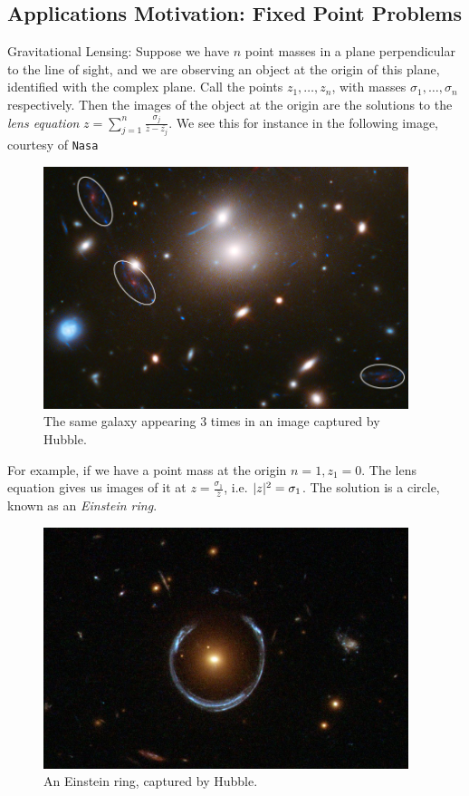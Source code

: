 \documentclass[10pt,a4paper]{article}
\begin{document}
\subsection{Applications Motivation: Fixed Point Problems}
Gravitational Lensing: Suppose we have $n$ point masses in a plane perpendicular to the line of sight, and we are observing an object at the origin of this plane, identified with the complex plane. Call the points $z_1, \ldots, z_n$, with masses $\sigma_1, \ldots, \sigma_n$ respectively. Then the images of the object at the origin are the solutions to the \emph{lens equation} $z = \sum_{j=1}^n \frac{\sigma_j}{\bar{z} - \bar{z_j}}$. We see this for instance in the following image, courtesy of \texttt{Nasa}
\begin{figure}[H]
  \centering
  \includegraphics[width=0.95\textwidth]{compdyn03.jpg}
  \caption{The same galaxy appearing 3 times in an image captured by Hubble.}
\end{figure}

For example, if we have a point mass at the origin $n=1, z_1 = 0$. The lens equation gives us images of it at $z = \frac{\sigma_1}{\bar{z}}$, i.e. $\lvert z\rvert^2 = \sigma_1$. The solution is a circle, known as an \emph{Einstein ring}.
\begin{figure}[H]
  \centering
  \includegraphics[width=0.95\textwidth]{compdyn04.jpg}
  \caption{An Einstein ring, captured by Hubble.}
\end{figure}
\end{document}
